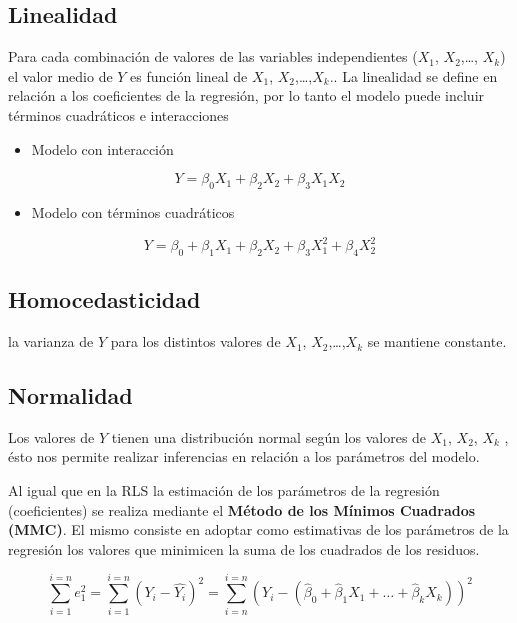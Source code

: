 \documentclass[
  spanish,
  a4paper,
]{scrbook}
\providecommand{\tightlist}{%
  \setlength{\itemsep}{0pt}\setlength{\parskip}{0pt}}
\begin{document}
\subsection{Linealidad}\label{linealidad}

Para cada combinación de valores de las variables independientes
(\(X_1\), \(X_2\),\ldots, \(X_k\)) el valor medio de \(Y\) es función
lineal de \(X_1\), \(X_2\),\ldots,\(X_k\).. La linealidad se define en
relación a los coeficientes de la regresión, por lo tanto el modelo
puede incluir términos cuadráticos e interacciones

\begin{itemize}
\tightlist
\item
  Modelo con interacción
\end{itemize}

\[
Y = \beta_0X_1 + \beta_2X_2 + \beta_3X_1X_2 
\]

\begin{itemize}
\tightlist
\item
  Modelo con términos cuadráticos
\end{itemize}

\[
Y = \beta_0 + \beta_1X_1 + \beta_2X_2 + \beta_3X_1^2 + \beta_4X_2^2 
\]

\subsection{Homocedasticidad}\label{homocedasticidad-2}

la varianza de \(Y\) para los distintos valores de \(X_1\),
\(X_2\),\ldots,\(X_k\) se mantiene constante.

\subsection{Normalidad}\label{normalidad-2}

Los valores de \(Y\) tienen una distribución normal según los valores de
\(X_1\), \(X_2\), \(X_k\) , ésto nos permite realizar inferencias en
relación a los parámetros del modelo.

Al igual que en la RLS la estimación de los parámetros de la regresión
(coeficientes) se realiza mediante el \textbf{Método de los Mínimos
Cuadrados} \textbf{(MMC)}. El mismo consiste en adoptar como estimativas
de los parámetros de la regresión los valores que minimicen la suma de
los cuadrados de los residuos.

\[ 
\sum_{i=1}^{i=n}e_1^2=\sum_{i=1}^{i=n}(Y_i-\hat{Y_i})^2=\sum_{i=n}^{i=n}(Y_i-(\hat{\beta}_0+\hat{\beta}_1X_1+\dots+\hat{\beta}_kX_k))^2
\]
\end{document}
